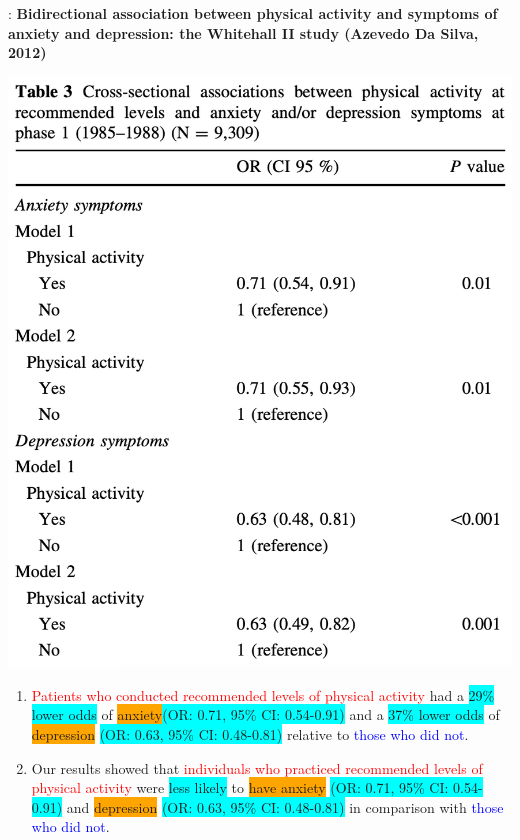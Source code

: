 \begin{frame}{\secname: \subsecname}
\footnotesize \textbf{Bidirectional association between physical activity and symptoms of anxiety and depression: the Whitehall II study (Azevedo Da Silva, 2012)}
\begin{minipage}{0.45\textwidth}
\vspace{2mm}
\includegraphics[scale=0.3]{image/physical.png}
\end{minipage}
\begin{minipage}{0.54\textwidth}
\begin{enumerate}
    \footnotesize
    \item<2|handout:2-> \textcolor{red}{Patients who conducted recommended levels of physical activity} had a \colorbox{cyan}{29\% lower odds} of \colorbox{orange}{anxiety}\colorbox{cyan}{(OR: 0.71, 95\% CI: 0.54-0.91)} and a \colorbox{cyan}{37\% lower odds} of \colorbox{orange}{depression} \colorbox{cyan}{(OR: 0.63, 95\% CI: 0.48-0.81)} relative to \textcolor{blue}{those who did not}.
    \item<3|handout:3> Our results showed that \textcolor{red}{individuals who practiced recommended levels of physical activity} were \colorbox{cyan}{less likely} to \colorbox{orange}{have anxiety} \colorbox{cyan}{(OR: 0.71, 95\% CI: 0.54-0.91)} and \colorbox{orange}{depression} \colorbox{cyan}{(OR: 0.63, 95\% CI: 0.48-0.81)} in comparison with \textcolor{blue}{those who did not}.
\end{enumerate}
\end{minipage}
\end{frame}



